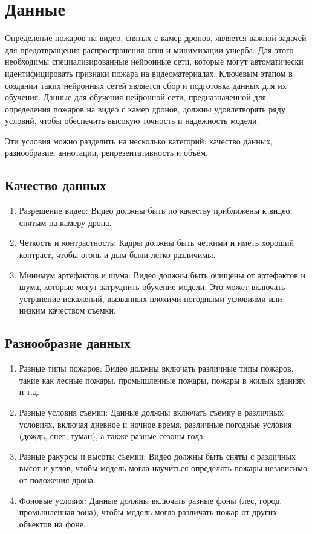 \chapter{Данные}
\label{ch:data}

    Определение пожаров на видео, снятых с камер дронов, является важной задачей для предотвращения распространения огня и минимизации ущерба. Для этого необходимы специализированные нейронные сети, которые могут автоматически идентифицировать признаки пожара на видеоматериалах. Ключевым этапом в создании таких нейронных сетей является сбор и подготовка данных для их обучения. Данные для обучения нейронной сети, предназначенной для определения пожаров на видео с камер дронов, должны удовлетворять ряду условий, чтобы обеспечить высокую точность и надежность модели.

    Эти условия можно разделить на несколько категорий: качество данных, разнообразие, аннотации, репрезентативность и объём.

    \section{Качество данных}
    \begin{enumerate}
        \item Разрешение видео: Видео должны быть по качеству приближены к видео, снятым на камеру дрона. 
        \item Четкость и контрастность: Кадры должны быть четкими и иметь хороший контраст, чтобы огонь и дым были легко различимы.
        \item Минимум артефактов и шума: Видео должны быть очищены от артефактов и шума, которые могут затруднить обучение модели. Это может включать устранение искажений, вызванных плохими погодными условиями или низким качеством съемки.
    \end{enumerate}

    \section{Разнообразие данных}
    \begin{enumerate}
        \item Разные типы пожаров: Видео должны включать различные типы пожаров, такие как лесные пожары, промышленные пожары, пожары в жилых зданиях и т.д.
        \item Разные условия съемки: Данные должны включать съемку в различных условиях, включая дневное и ночное время, различные погодные условия (дождь, снег, туман), а также разные сезоны года.
        \item Разные ракурсы и высоты съемки: Видео должны быть сняты с различных высот и углов, чтобы модель могла научиться определять пожары независимо от положения дрона.
        \item Фоновые условия: Данные должны включать разные фоны (лес, город, промышленная зона), чтобы модель могла различать пожар от других объектов на фоне.
    \end{enumerate}

